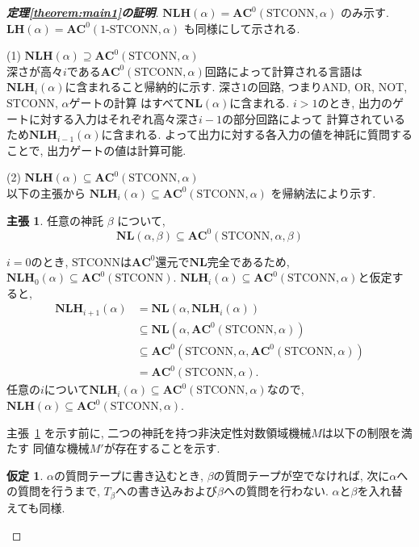 \documentclass[10pt,a4paper,twocolumn]{jarticle}
\theoremstyle{definition}
\newtheorem{claim}[theorem]{主張}
\newtheorem*{assumption}{仮定}
\theoremstyle{remark}
\newcommand{\classfont}{\mathbf}
\newcommand{\AC}{\classfont{AC}}
\newcommand{\NL}{\classfont{NL}}
\newcommand{\LH}{\classfont{LH}}
\newcommand{\NLH}{\classfont{NLH}}
\newcommand{\probfont}{\text}
\newcommand{\oneSTCONN}{\probfont{1-STCONN}}
\newcommand{\STCONN}{\probfont{STCONN}}
\begin{document}
\begin{proof}[\bf 定理\ref{theorem:main1}の証明]
 $\NLH(\alpha) = \AC^0(\STCONN, \alpha)$ のみ示す.
 $\LH(\alpha) = \AC^0(\oneSTCONN, \alpha)$ も同様にして示される.


 (1) $\NLH(\alpha) \supseteq \AC^0(\STCONN, \alpha)$\\
 深さが高々$i$である$\AC^0(\STCONN, \alpha)$回路によって計算される言語は
 $\NLH_i(\alpha)$に含まれること帰納的に示す.
 深さ$1$の回路, つまりAND, OR, NOT, $\STCONN$, $\alpha$ゲートの計算
 はすべて$\NL(\alpha)$に含まれる.
 $i > 1$のとき,
 出力のゲートに対する入力はそれぞれ高々深さ$i-1$の部分回路によって
 計算されているため$\NLH_{i-1}(\alpha)$に含まれる.
 よって出力に対する各入力の値を神託に質問することで,
 出力ゲートの値は計算可能.

 (2) $\NLH(\alpha) \subseteq \AC^0(\STCONN, \alpha)$\\
 以下の主張から $\NLH_i(\alpha) \subseteq \AC^0(\STCONN, \alpha)$
 を帰納法により示す.
\begin{claim}
 \label{claim: NLsubseteqAC0STCONN}
 任意の神託 $\beta$ について,
 \begin{equation*}
  \NL(\alpha, \beta) \subseteq \AC^0(\STCONN, \alpha, \beta)
 \end{equation*}
\end{claim}
 $i=0$のとき,
 $\STCONN$は$\AC^0$還元で$\NL$完全であるため,
 $\NLH_0(\alpha) \subseteq \AC^0(\STCONN)$.
 $\NLH_i(\alpha) \subseteq \AC^0(\STCONN, \alpha)$と仮定すると,
 \begin{align*}
  \NLH_{i+1}(\alpha) 
  & = 
  \NL(\alpha, \NLH_i(\alpha)) \\
  & \subseteq
  \NL(\alpha, \AC^0(\STCONN, \alpha)) \\
  & \subseteq
  \AC^0(\STCONN, \alpha, \AC^0(\STCONN, \alpha)) \\
  & =
  \AC^0(\STCONN, \alpha).
 \end{align*}
任意の$i$について$\NLH_i(\alpha) \subseteq \AC^0(\STCONN, \alpha)$なので, $\NLH(\alpha) \subseteq \AC^0(\STCONN, \alpha)$.


主張~\ref{claim: NLsubseteqAC0STCONN} を示す前に,
二つの神託を持つ非決定性対数領域機械$M$は以下の制限を満たす
同値な機械$M'$が存在することを示す.
\begin{assumption}
$\alpha$の質問テープに書き込むとき, $\beta$の質問テープが空でなければ,
次に$\alpha$への質問を行うまで,
$T_\beta$への書き込みおよび$\beta$への質問を行わない.
$\alpha$と$\beta$を入れ替えても同様.
\end{assumption}


\end{proof}
\end{document}
